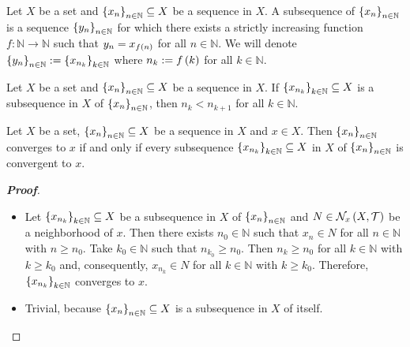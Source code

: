 \begin{definition}
  Let $X$ be a set and $\left\{x_n\right\}_{n\in\mathbb{N}}\subseteq X$ be a sequence in $X$. A subsequence of $\left\{x_n\right\}_{n\in\mathbb{N}}$ is a sequence $\left\{y_n\right\}_{n\in\mathbb{N}}$ for which there exists a strictly increasing function $f:\mathbb{N}\rightarrow\mathbb{N}$ such that $y_n=x_{f\left(n\right)}$ for all $n\in\mathbb{N}$. We will denote $\left\{y_n\right\}_{n\in\mathbb{N}}:=\left\{x_{n_k}\right\}_{k\in\mathbb{N}}$ where $n_k:=f\left(k\right)$ for all $k\in\mathbb{N}$. 
\end{definition}

\begin{remark}
  Let $X$ be a set and $\left\{x_n\right\}_{n\in\mathbb{N}}\subseteq X$ be a sequence in $X$. If $\left\{x_{n_k}\right\}_{k\in\mathbb{N}}\subseteq X$ is a subsequence in $X$ of $\left\{x_n\right\}_{n\in\mathbb{N}}$, then $n_k<n_{k+1}$ for all $k\in\mathbb{N}$.
\end{remark}

\begin{proposition}
  Let $X$ be a set, $\left\{x_n\right\}_{n\in\mathbb{N}}\subseteq X$ be a sequence in $X$ and $x\in X$. Then $\left\{x_n\right\}_{n\in\mathbb{N}}$ converges to $x$ if and only if every subsequence $\left\{x_{n_k}\right\}_{k\in\mathbb{N}}\subseteq X$ in $X$ of $\left\{x_n\right\}_{n\in\mathbb{N}}$ is convergent to $x$.
  \begin{proof}[\rm\textbf{Proof}]
    \hfill
    \begin{itemize}
      \item[$\boxed{\Rightarrow}$] Let $\left\{x_{n_k}\right\}_{k\in\mathbb{N}}\subseteq X$ be a subsequence in $X$ of $\left\{x_n\right\}_{n\in\mathbb{N}}$ and $N\in\mathcal{N}_x\left(X,\mathcal{T}\right)$ be a neighborhood of $x$. Then there exists $n_0\in\mathbb{N}$ such that $x_n\in N$ for all $n\in\mathbb{N}$ with $n\geq n_0$. Take $k_0\in\mathbb{N}$ such that $n_{k_0}\geq n_0$. Then $n_k\geq n_0$ for all $k\in\mathbb{N}$ with $k\geq k_0$ and, consequently, $x_{n_k}\in N$ for all $k\in\mathbb{N}$ with $k\geq k_0$. Therefore, $\left\{x_{n_k}\right\}_{k\in\mathbb{N}}$ converges to $x$.
      \item[$\boxed{\Leftarrow}$] Trivial, because $\left\{x_n\right\}_{n\in\mathbb{N}}\subseteq X$ is a subsequence in $X$ of itself.
    \end{itemize}
  \end{proof} 
\end{proposition}

